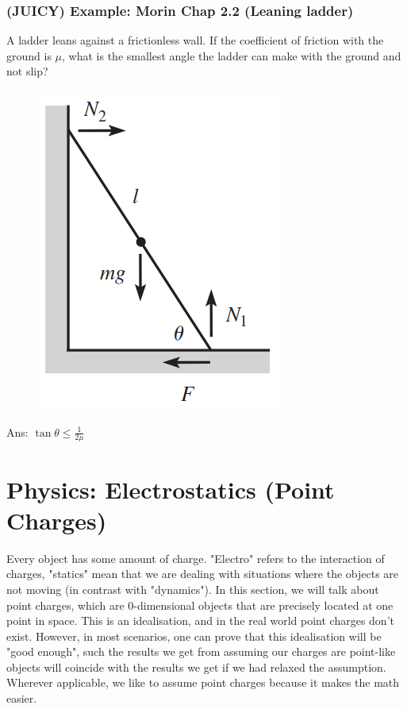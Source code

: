 \documentclass{article}
\begin{document}
\subsubsection{(JUICY) Example: Morin Chap 2.2 (Leaning ladder)}
A ladder leans against a frictionless wall. If the coefficient of friction with the ground is $\mu$, what is the smallest angle the ladder can make with the ground and not slip?\\
\begin{figure} 
\includegraphics[width=\linewidth]{images/morinleaningladder.png}
\label{fig:morinleaningladder}
\end{figure}
Ans: $\tan \theta \leq \frac{1}{2\mu}$
\clearpage 
\section{Physics: Electrostatics (Point Charges)}
Every object has some amount of charge. "Electro" refers to the interaction of charges, "statics" mean that we are dealing with situations where the objects are not moving (in contrast with "dynamics"). In this section, we will talk about point charges, which are 0-dimensional objects that are precisely located at one point in space. This is an idealisation, and in the real world point charges don't exist. However, in most scenarios, one can prove that this idealisation will be "good enough", such the results we get from assuming our charges are point-like objects will coincide with the results we get if we had relaxed the assumption. Wherever applicable, we like to assume point charges because it makes the math easier.
\end{document}
